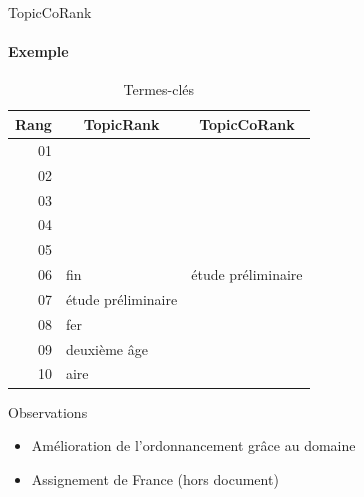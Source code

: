 \begin{frame}{TopicCoRank}\framesubtitle{Exemple}
  \begin{table}
      \centering
      \begin{tabular}{r|l|l}
        \toprule
        \textbf{Rang} & \multicolumn{1}{c|}{\textbf{TopicRank}} & \multicolumn{1}{c}{\textbf{TopicCoRank}} \\
        \hline
        01 & \cellcolor{termithorange!30}{décors} & \cellcolor{termithorange!30}{céramique} \\
        02 & \cellcolor{termithorange!30}{céramique} & \cellcolor{termithorange!30}{décors} \\
        03 & \cellcolor{termithorange!30}{chronologie} & \cellcolor{termithorange!30}{typologie} \\
        04 & \cellcolor{termithorange!30}{typologie} & \cellcolor{termithorange!30}{chronologie} \\
        05 & \cellcolor{termithorange!30}{production} & \cellcolor{termithorange!30}{production} \\
        06 & fin & étude préliminaire \\
        07 & étude préliminaire & \cellcolor{termithorange!30}{diffusion} \\
        08 & fer & \cellcolor{Cerulean!30}{analyse} \\
        09 & deuxième âge & \cellcolor{Cerulean!30}{France} \\
        10 & aire & \cellcolor{termithorange!30}{répartition} \\
        \bottomrule
      \end{tabular}

      \caption{Termes-clés}
    \end{table}

    \begin{block}{Observations}
      \begin{itemize}
        \item{Amélioration de l'ordonnancement grâce au domaine}
        \item{Assignement de \og{}France\fg{} (hors document)}
      \end{itemize}
    \end{block}
\end{frame}

